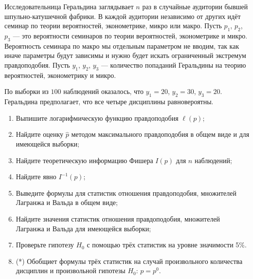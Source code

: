 \begin{problem}
Исследовательница Геральдина заглядывает $n$ раз в случайные аудитории бывшей шпульно-катушечной фабрики. 
В каждой аудитории независимо от других идёт семинар по теории вероятностей, эконометрике, микро или макро. 
Пусть $p_1$, $p_2$, $p_3$ — это вероятности семинаров по теории вероятностей, эконометрике и микро. 
Вероятность семинара по макро мы отдельным параметром не вводим, так как иначе параметры будут зависимы и нужно будет искать ограниченный экстремум правдоподобия. 
Пусть $y_1$, $y_2$, $y_3$ — количество попаданий Геральдины на теорию вероятностей, эконометрику и микро.

По выборки из $100$ наблюдений оказалось, что $y_1=20$, $y_2=30$, $y_3=20$. 
Геральдина предполагает, что все четыре дисциплины равновероятны.

\begin{enumerate}
  \item Выпишите логарифмическую функцию правдоподобия $\ell(p)$;
  \item Найдите оценку $\hat p$ методом максимального правдоподобия
    в общем виде и для имеющейся выборки;
  \item Найдите теоретическую информацию Фишера $I(p)$ для $n$ наблюдений;
  \item Найдите явно $I^{-1}(p)$;
  \item Выведите формулы для статистик отношения правдоподобия, множителей Лагранжа и Вальда в общем виде;
  \item Найдите значения статистик отношения правдоподобия, множителей Лагранжа и Вальда для имеющейся выборки;
  \item Проверьте гипотезу $H_0$ с помощью трёх статистик на уровне значимости 5\%.
  \item (*) Обобщиет формулы трёх статистик на случай произвольного количества дисциплин и произвольной гипотезы $H_0$: $p=p^0$.
\end{enumerate}



\end{problem}
